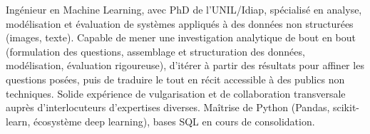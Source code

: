 


\begin{cvparagraph}
Ingénieur en Machine Learning, avec PhD de l'UNIL/Idiap, spécialisé en analyse, modélisation et évaluation de systèmes appliqués à des données non structurées (images, texte).  Capable de mener une investigation analytique de bout en bout (formulation des questions, assemblage et structuration des données, modélisation, évaluation rigoureuse), d'itérer à partir des résultats pour affiner les questions posées, puis de traduire le tout en récit accessible à des publics non techniques. Solide expérience de vulgarisation et de collaboration transversale auprès d'interlocuteurs d'expertises diverses. Maîtrise de Python (Pandas, scikit-learn, écosystème deep learning), bases SQL en cours de consolidation.
\end{cvparagraph}

